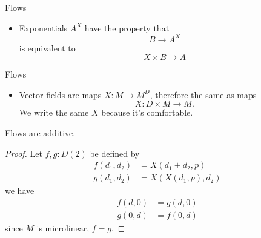 \documentclass{beamer}
\begin{document}
\begin{frame}{Flows}
  \begin{itemize}
    \item Exponentials \( A^X \) have the property that
      \begin{equation*}
        B\to A^X 
      \end{equation*}
      is equivalent to
      \begin{equation*}
        X\times B \to A
      \end{equation*}
  \end{itemize}
\end{frame}

\begin{frame}{Flows}
  \begin{itemize}
    \item Vector fields are maps \( X:M\to M^D \), therefore the same as maps
      \begin{equation*}
        X: D\times M \to M.
      \end{equation*}
      We write the same \( X \) because it's comfortable.
  \end{itemize}
\end{frame}

\begin{frame}
  \begin{proposition}
    Flows are additive.
  \end{proposition}
  \begin{proof}
    Let \( f,g:D(2) \) be defined by
    \begin{align*}
      f(d_1,d_2) &= X(d_1+d_2,p)\\
      g(d_1,d_2) &= X(X(d_1,p),d_2)
    \end{align*}
    we have
    \begin{align*}
      f(d,0) &= g(d,0)\\
      g(0,d) &= f(0,d)
    \end{align*}
    since \( M \) is microlinear, \( f=g \).
  \end{proof}
\end{frame}
\end{document}
